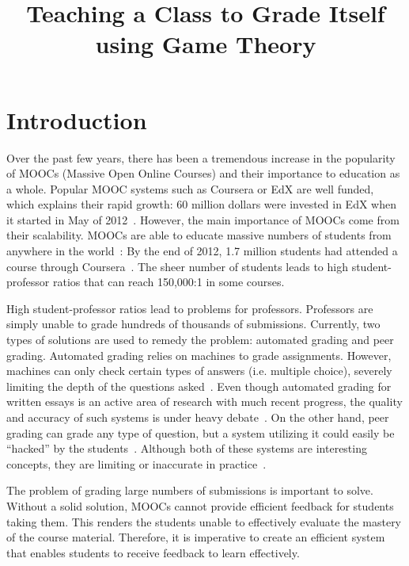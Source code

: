 \documentclass[12pt, Arial]{article}
\title{Teaching a Class to Grade Itself using Game Theory}
\author{}%
\date{}
\begin{document}
\maketitle
\section{Introduction}
Over the past few years, there has been a tremendous increase in the popularity of MOOCs (Massive Open Online Courses) and their importance to education as a whole. Popular MOOC systems such as Coursera or EdX are well funded, which explains their rapid growth: 60 million dollars were invested in EdX when it started in May of 2012~\cite{canmoocsreducecc}. However, the main importance of MOOCs come from their scalability. MOOCs are able to educate massive numbers of students from anywhere in the world~\cite{makingsenseofmoocs}: By the end of 2012, 1.7 million students had attended a course through Coursera~\cite{swotanalysisofmoocs}. The sheer number of students leads to high student-professor ratios that can reach 150,000:1 in some courses.

High student-professor ratios lead to problems for professors. Professors are simply unable to grade hundreds of thousands of submissions. Currently, two types of solutions are used to remedy the problem: automated grading and peer grading. Automated grading relies on machines to grade assignments. However, machines can only check certain types of answers (i.e. multiple choice), severely limiting the depth of the questions asked~\cite{rightandwrongmoocs}. Even though automated grading for written essays is an active area of research with much recent progress, the quality and accuracy of such systems is under heavy debate~\cite{automatedsystemssuck}. On the other hand, peer grading can grade any type of question, but a system utilizing it could easily be ``hacked'' by the students~\cite{makingsenseofmoocs}. Although both of these systems are interesting concepts, they are limiting or inaccurate in practice~\cite{howaccurateispeergrading}.

The problem of grading large numbers of submissions is important to solve. Without a solid solution, MOOCs cannot provide efficient feedback for students taking them. This renders the students unable to effectively evaluate the mastery of the course material. Therefore, it is imperative to create an efficient system that enables students to receive feedback to learn effectively.
\end{document}
